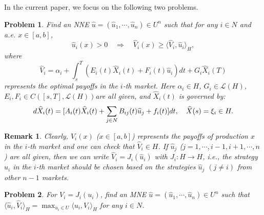 \documentclass[10pt]{article}
\newtheorem{prob}{Problem}[section]
\newtheorem{remark}{Remark}[section]
\begin{document}
In the current paper, we focus on  the following two problems.
\begin{prob}\label{2}
Find an NNE $\widehat{u}=(\widehat{u}_1,\cdots,\widehat{u}_n)\in U^n$ such  that for any $i\in N$ and a.e. $x\in[a,b]$,
\begin{equation}\label{4}
\widehat{u}_i(x)>0\quad\Rightarrow\quad\widehat{V}_i(x)\geq\langle\widehat{V}_i,\widehat{u}_i\rangle_{H},
\end{equation}
where 
\begin{equation}\label{9}
\widehat{V}_i=\alpha_i+\int_s^T(E_i(t)\widehat{X}_{i}(t)+F_i(t)\widehat{u}_i)dt+G_i\widehat{X}_{i}(T)
\end{equation}
represents the optimal payoffs in the $i$-th market. Here   $\alpha_i\in H$, $G_i\in\mathcal{L}(H)$, $E_i,F_i\in C([s,T],\mathcal{L}(H))$are all given, and $\widehat{X}_{i}(t)$ is governed by:
\begin{equation}\label{57}
d\widehat{X}_{i}(t)=[A_i(t)\widehat{X}_{i}(t)+\sum_{j\in N}B_{ij}(t)\widehat{u}_j+f_i(t)]dt,\\
\quad \widehat{X}(s)=\xi_i\in H.
\end{equation}
\end{prob}
\begin{remark}
Clearly,  $\widehat{V}_i(x)$ ($x\in[a,b]$) represents the payoffs of production $x$ in the $i$-th market and one can check that $\widehat{V}_i\in H$. If $\widehat{u}_j$ ($j=1,\cdots,i-1,i+1,\cdots,n$) are all given, then we can write $\widehat{V}_i=J_i(\widehat{u}_i)$ with $J_i:H\rightarrow H$, i.e., the strategy $\widehat{u}_i$ in the $i$-th market should be chosen based on the strategies $\widehat{u}_j$ $(j\neq i)$ from other $n-1$ markets.
\end{remark}

\begin{prob}\label{62}
For $V_i=J_i(u_i)$, find an MNE $\widehat{u}=(\widehat{u}_1,\cdots,\widehat{u}_n)\in U^n$ such  that 
$\langle \widehat{u}_i,\widehat{V}_i\rangle_H=\max_{u_i\in U}\langle u_i,V_i\rangle_H$ for any $i\in N$.
\end{prob}
\end{document}
